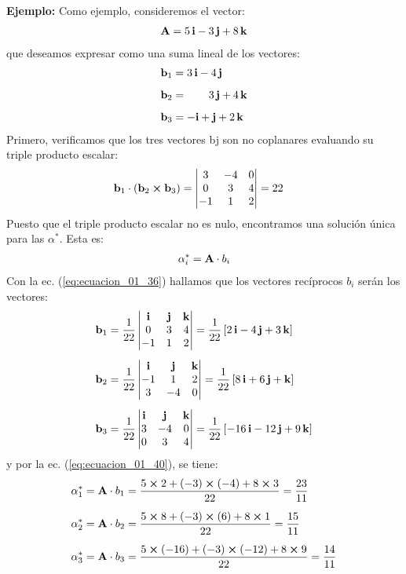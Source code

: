 \documentclass[12pt]{article}
\begin{document}
\noindent
\textbf{Ejemplo:} Como ejemplo, consideremos el vector:
\begin{align*}
    \vb{A} = 5 \, \vb{i} - 3 \, \vb{j} + 8 \, \vb{k}
\end{align*}
que deseamos expresar como una suma lineal de los vectores:
\begin{align*}
    \vb{b}_{1} &= 3 \, \vb{i} - 4 \, \vb{j} \\[0.5em]
    \vb{b}_{2} &= \quad \quad 3 \, \vb{j} + 4 \, \vb{k} \\[0.5em]
    \vb{b}_{3} &= - \vb{i} + \vb{j} + 2 \, \vb{k}
\end{align*}
Primero, verificamos que los tres vectores bj son no coplanares evaluando su triple producto escalar:
\begin{align*}
    \vb{b}_{1} \cdot \left( \vb{b}_{2} \cp \vb{b}_{3} \right) &= \mdet{
        3 & -4 & 0 \\
        0 & 3 & 4 \\
        -1 & 1 & 2
    } = 22
\end{align*}
Puesto que el triple producto escalar no es nulo, encontramos una solución única para las $\alpha^{*}$. Esta es:
\begin{align*}
    \alpha_{i}^{*} = \vb{A} \cdot b_{i}
\end{align*}
Con la ec. (\ref{eq:ecuacion_01_36}) hallamos que los vectores recíprocos $b_{i}$ serán los vectores:
\begin{align*}
    \vb{b}_{1} &= \dfrac{1}{22} \mdet{
        \vb{i} & \vb{j} & \vb{k} \\
        0 & 3 & 4 \\
        -1 & 1 & 2
    } = \dfrac{1}{22} \left[ 2 \, \vb{i} - 4 \, \vb{j} + 3 \, \vb{k} \right] \\[0.5em]
    \vb{b}_{2} &= \dfrac{1}{22} \mdet{
        \vb{i} & \vb{j} & \vb{k} \\
        -1 & 1 & 2 \\
        3 & -4 & 0
    } = \dfrac{1}{22} \left[ 8 \, \vb{i} + 6 \, \vb{j} + \vb{k} \right] \\[0.5em]
    \vb{b}_{3} &= \dfrac{1}{22} \mdet{
        \vb{i} & \vb{j} & \vb{k} \\
        3 & -4 & 0 \\
        0 & 3 & 4
    } = \dfrac{1}{22} \left[ -16 \, \vb{i} - 12 \, \vb{j} + 9 \, \vb{k} \right]
\end{align*}
y por la ec. (\ref{eq:ecuacion_01_40}), se tiene:
\begin{align*}
    \alpha_{1}^{*} &= \vb{A} \cdot b_{1} = \dfrac{5 \cp 2 + \left( -3 \right) \cp \left( -4 \right) + 8 \cp 3}{22} = \dfrac{23}{11} \\[0.5em]
    \alpha_{2}^{*} &= \vb{A} \cdot b_{2} = \dfrac{5 \cp 8 + \left( -3 \right) \cp \left( 6 \right) + 8 \cp 1}{22} = \dfrac{15}{11} \\[0.5em]
    \alpha_{3}^{*} &= \vb{A} \cdot b_{3} = \dfrac{5 \cp \left( -16 \right) + \left( - 3 \right) \cp \left( -12 \right) + 8 \cp 9}{22} = \dfrac{14}{11}
\end{align*}
\end{document}
